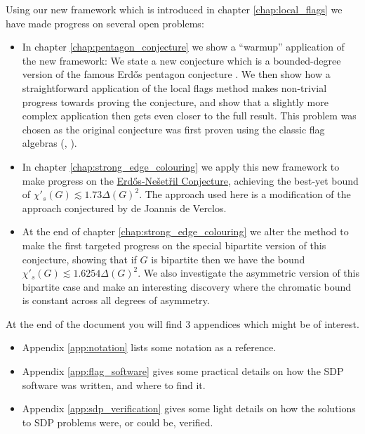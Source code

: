 Using our new framework which is introduced in chapter \ref{chap:local_flags}
we have made progress on several open problems:
\begin{itemize}
    \item In chapter \ref{chap:pentagon_conjecture} we show a ``warmup'' application of the new
        framework: We state a new conjecture which is a bounded-degree version of the famous
        Erd\H{o}s pentagon conjecture \cite{erdos_pentagon_1984}.
        We then show how a straightforward application of the local flags method makes non-trivial
        progress towards proving the conjecture, and show that a slightly more complex application
        then gets even closer to the full result.
        This problem was chosen as the original conjecture was first proven using
        the classic flag algebras (\cite{hatamiNumberPentagonsTrianglefree2013},
        \cite{grzesikMaximumNumberFivecycles2012}).
    \item In chapter \ref{chap:strong_edge_colouring} we apply this new framework to make progress on the
        \hyperref[conj:intro_erdos_nesetril]{Erd\H{o}s-Nešetřil Conjecture}, achieving the best-yet
        bound of $\chi'_s(G) \lesssim 1.73\Delta(G)^2$. The approach used here is a modification
        of the approach conjectured by de Joannis de Verclos.
    \item At the end of chapter \ref{chap:strong_edge_colouring} we alter the method to make
        the first targeted progress on the special bipartite version of this conjecture, showing that
        if $G$ is bipartite then we have the bound $\chi'_s(G) \lesssim 1.6254\Delta(G)^2$. We also
        investigate the asymmetric version of this bipartite case and make an interesting discovery
        where the chromatic bound is constant across all degrees of asymmetry.
\end{itemize}

At the end of the document you will find 3 appendices which might be of interest.
\begin{itemize}
    \item Appendix \ref{app:notation} lists some notation as a reference.
    \item Appendix \ref{app:flag_software} gives some practical details on how the SDP
        software was written, and where to find it.
    \item Appendix \ref{app:sdp_verification} gives some light details on how the solutions
        to SDP problems were, or could be, verified.
\end{itemize}
